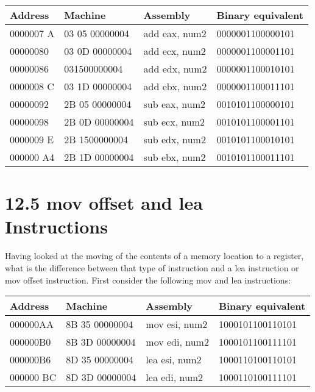 \documentclass[10pt]{article}
\begin{document}
\begin{center}
\begin{tabular}{|l|l|l|l|}
\hline
Address & Machine & Assembly & Binary equivalent \\
\hline
0000007 A & 03 05 00000004 & add eax, num2 & 0000001100000101 \\
\hline
00000080 & 03 0D 00000004 & add ecx, num2 & 0000001100001101 \\
\hline
00000086 & 031500000004 & add edx, num2 & 0000001100010101 \\
\hline
0000008 C & 03 1D 00000004 & add ebx, num2 & 0000001100011101 \\
\hline
00000092 & 2B 05 00000004 & sub eax, num2 & 0010101100000101 \\
\hline
00000098 & 2B 0D 00000004 & sub ecx, num2 & 0010101100001101 \\
\hline
0000009 E & 2B 1500000004 & sub edx, num2 & 0010101100010101 \\
\hline
000000 A4 & 2B 1D 00000004 & sub ebx, num2 & 0010101100011101 \\
\hline
\end{tabular}
\end{center}

\section*{12.5 mov offset and lea Instructions}
Having looked at the moving of the contents of a memory location to a register, what is the difference between that type of instruction and a lea instruction or mov offset instruction. First consider the following mov and lea instructions:

\begin{center}
\begin{tabular}{|l|l|l|l|}
\hline
Address & Machine & Assembly & Binary equivalent \\
\hline
000000AA & 8B 35 00000004 & mov esi, num2 & 1000101100110101 \\
\hline
000000B0 & 8B 3D 00000004 & mov edi, num2 & 1000101100111101 \\
\hline
000000B6 & 8D 35 00000004 & lea esi, num2 & 1000110100110101 \\
\hline
000000 BC & 8D 3D 00000004 & lea edi, num2 & 1000110100111101 \\
\hline
\end{tabular}
\end{center}
\end{document}
